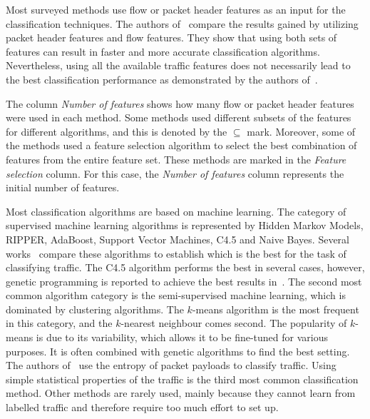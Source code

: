 Most surveyed methods use flow or packet header features as an input for the classification techniques. The authors of~\cite{Alshammari-2009-Preliminary, Alshammari-2011-Can} compare the results gained by utilizing packet header features and flow features. They show that using both sets of features can result in faster and more accurate classification algorithms. Nevertheless, using all the available traffic features does not necessarily lead to the best classification performance as demonstrated by the authors of~\cite{Alshammari-2009-Classifying}.

The column \emph{Number of features} shows how many flow or packet header features were used in each method. Some methods used different subsets of the features for different algorithms, and this is denoted by the $\subseteq$ mark. Moreover, some of the methods used a feature selection algorithm to select the best combination of features from the entire feature set. These methods are marked in the \emph{Feature selection} column. For this case, the \emph{Number of features} column represents the initial number of features.

Most classification algorithms are based on machine learning. The category of supervised machine learning algorithms is represented by Hidden Markov Models, RIPPER, AdaBoost, Support Vector Machines, C4.5 and Naive Bayes. Several works~\cite{Alshammari-2007-flow, Alshammari-2009-Machine, Alshammari-2010-Investigation, Alshammari-2011-Can} compare these algorithms to establish which is the best for the task of classifying traffic. The C4.5 algorithm performs the best in several cases, however, genetic programming is reported to achieve the best results in~\cite{Alshammari-2011-Can}. The second most common algorithm category is the semi-supervised machine learning, which is dominated by clustering algorithms. The $k$-means algorithm is the most frequent in this category, and the $k$-nearest neighbour comes second. The popularity of $k$-means is due to its variability, which allows it to be fine-tuned for various purposes. It is often combined with genetic algorithms to find the best setting. The authors of~\cite{Wang-2011-Using, Khakpour-2013-Information} use the entropy of packet payloads to classify traffic. Using simple statistical properties of the traffic is the third most common classification method. Other methods are rarely used, mainly because they cannot learn from labelled traffic and therefore require too much effort to set up.

